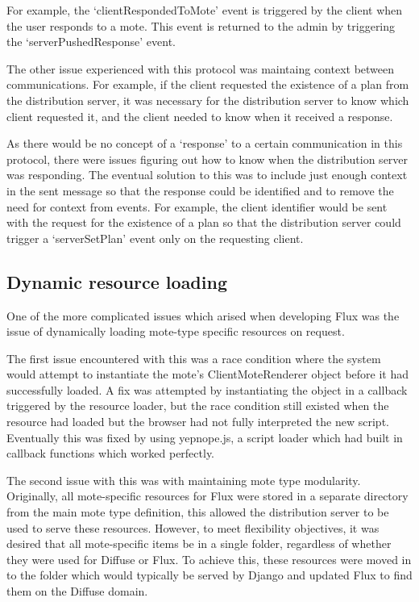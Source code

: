 \documentclass[a4papert,11pt,notitlepage]{ltxdoc}
\begin{document}
For example, the `clientRespondedToMote' event is triggered by the client when the user responds to a mote. This event is returned to the admin by triggering the `serverPushedResponse' event.

The other issue experienced with this protocol was maintaing context between communications. For example, if the client requested the existence of a plan from the distribution server, it was necessary for the distribution server to know which client requested it, and the client needed to know when it received a response. 

As there would be no concept of a `response' to a certain communication in this protocol, there were issues figuring out how to know when the distribution server was responding. The eventual solution to this was to include just enough context in the sent message so that the response could be identified and to remove the need for context from events. For example, the client identifier would be sent with the request for the existence of a plan so that the distribution server could trigger a `serverSetPlan' event only on the requesting client.
 
 \subsection{Dynamic resource loading}
One of the more complicated issues which arised when developing Flux was the issue of dynamically loading mote-type specific resources on request. 

The first issue encountered with this was a race condition where the system would attempt to instantiate the mote's ClientMoteRenderer object before it had successfully loaded. A fix was attempted by instantiating the object in a callback triggered by the resource loader, but the race condition still existed when the resource had loaded but the browser had not fully interpreted the new script. Eventually this was fixed by using yepnope.js, a script loader which had built in callback functions which worked perfectly.

The second issue with this was with maintaining mote type modularity. Originally, all mote-specific resources for Flux were stored in a separate directory from the main mote type definition, this allowed the distribution server to be used to serve these resources. However, to meet flexibility objectives, it was desired that all mote-specific items be in a single folder, regardless of whether they were used for Diffuse or Flux. To achieve this, these resources were moved in to the folder which would typically be served by Django and updated Flux to find them on the Diffuse domain. 
\end{document}
